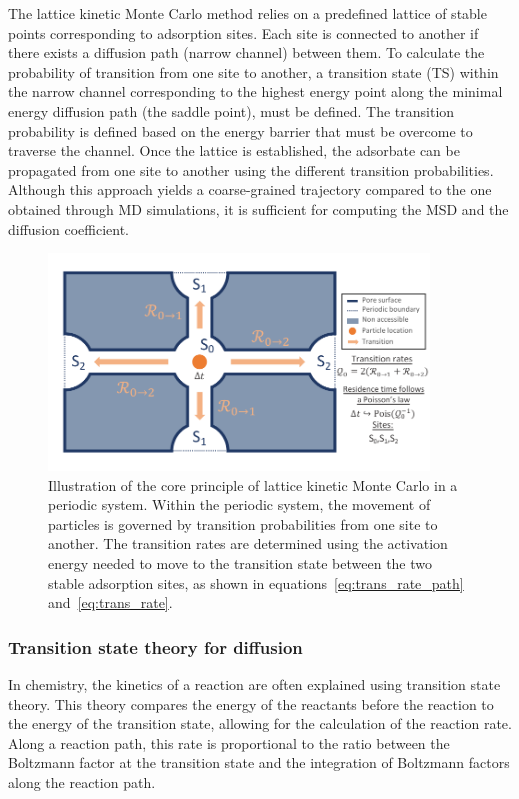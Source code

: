 \documentclass[main]{subfiles}
\begin{document}
The lattice kinetic Monte Carlo method relies on a predefined lattice of stable points corresponding to adsorption sites. Each site is connected to another if there exists a diffusion path (narrow channel) between them. To calculate the probability of transition from one site to another, a transition state (TS) within the narrow channel corresponding to the highest energy point along the minimal energy diffusion path (the saddle point), must be defined. The transition probability is defined based on the energy barrier that must be overcome to traverse the channel. Once the lattice is established, the adsorbate can be propagated from one site to another using the different transition probabilities. Although this approach yields a coarse-grained trajectory compared to the one obtained through MD simulations, it is sufficient for computing the MSD and the diffusion coefficient.


\begin{figure}[ht]
  \centering
    \includegraphics[width=0.9\textwidth]{figures/5-diffusion/kinetic_MC.pdf}
    \caption{Illustration of the core principle of lattice kinetic Monte Carlo in a periodic system. Within the periodic system, the movement of particles is governed by transition probabilities from one site to another. The transition rates are determined using the activation energy needed to move to the transition state between the two stable adsorption sites, as shown in equations~\ref{eq:trans_rate_path} and~\ref{eq:trans_rate}. }\label{fgr:kMC_principle}
\end{figure}

\subsubsection{Transition state theory for diffusion}

In chemistry, the kinetics of a reaction are often explained using transition state theory. This theory compares the energy of the reactants before the reaction to the energy of the transition state, allowing for the calculation of the reaction rate. Along a reaction path, this rate is proportional to the ratio between the Boltzmann factor at the transition state and the integration of Boltzmann factors along the reaction path.
\end{document}
